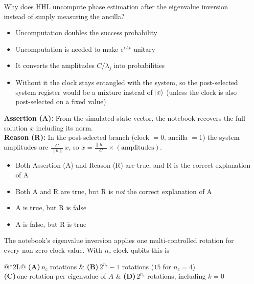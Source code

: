 \documentclass[11pt,a4paper]{article}
\newcommand{\optlabel}[1]{\textbf{(#1)}}
\newenvironment{qitem}[1]{\begin{list}{}{\setlength{\leftmargin}{3.3em}\setlength{\labelwidth}{3.1em}%
  \setlength{\labelsep}{0.2em}\setlength{\topsep}{3pt}\setlength{\parsep}{3pt}}\item[\textbf{Q.#1}\hfill]}{\end{list}}
\newcommand{\qsep}{\par\vspace{2pt}{\color{black!15}\hrule}\vspace{4pt}}
\begin{document}
\begin{qitem}{48}
Why does HHL uncompute phase estimation after the eigenvalue inversion instead of simply measuring the ancilla?
\begin{itemize}[leftmargin=2.6em, labelsep=0.4em, itemsep=2pt, topsep=3pt]
\item[\optlabel{A}] Uncomputation doubles the success probability
\item[\optlabel{B}] Uncomputation is needed to make $e^{iAt}$ unitary
\item[\optlabel{C}] It converts the amplitudes $C/\lambda_j$ into probabilities
\item[\optlabel{D}] Without it the clock stays entangled with the system, so the post-selected system register would be a mixture instead of $\ket x$ (unless the clock is also post-selected on a fixed value)
\end{itemize}
\end{qitem}
\qsep

\begin{qitem}{49}
\textbf{Assertion (A):} From the simulated state vector, the notebook recovers the full solution $x$ including its norm.\\[1mm]
\textbf{Reason (R):} In the post-selected branch (clock $= 0$, ancilla $= 1$) the system amplitudes are $\tfrac{C}{\|b\|}\,x$, so $x = \tfrac{\|b\|}{C}\times(\text{amplitudes})$.
\begin{itemize}[leftmargin=2.6em, labelsep=0.4em, itemsep=2pt, topsep=3pt]
\item[\optlabel{A}] Both Assertion (A) and Reason (R) are true, and R is the correct explanation of A
\item[\optlabel{B}] Both A and R are true, but R is \emph{not} the correct explanation of A
\item[\optlabel{C}] A is true, but R is false
\item[\optlabel{D}] A is false, but R is true
\end{itemize}
\end{qitem}
\qsep

\begin{qitem}{50}
The notebook's eigenvalue inversion applies one multi-controlled rotation for every non-zero clock value. With $n_c$ clock qubits this is
\par\smallskip\noindent\begin{tabularx}{\linewidth}{@{}*{2}{L}@{}}
\optlabel{A}\,$n_c$ rotations & \optlabel{B}\,$2^{n_c} - 1$ rotations ($15$ for $n_c = 4$) \\[3pt]
\optlabel{C}\,one rotation per eigenvalue of $A$ & \optlabel{D}\,$2^{n_c}$ rotations, including $k = 0$
\end{tabularx}
\end{qitem}
\qsep
\end{document}
